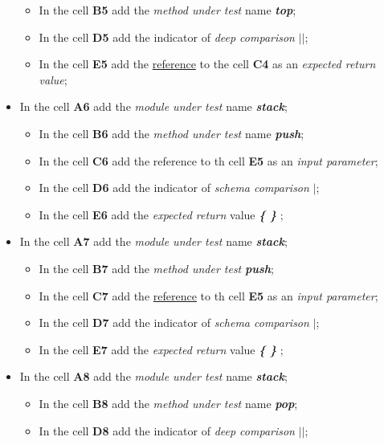 \begin{itemize}
\begin{itemize}
		\item In the cell \textbf{B5} add the \textit{method under test} name \textit{\textbf{top}};
		\item In the cell \textbf{D5} add the indicator of \textit{deep comparison}\textit{ \textbf{$||$}};
		\item In the cell \textbf{E5} add the \underline{reference} to the cell \textbf{C4} as an \textit{expected return value};
	\end{itemize}
%	
	\item In the cell \textbf{A6} add the \textit{module under test} name\textit{ \textbf{stack}};
	\begin{itemize}
		\item In the cell \textbf{B6} add the \textit{method under test} name\textit{ \textbf{push}};
		\item In the cell \textbf{C6} add the reference to th cell \textbf{E5} as an \textit{ input parameter};
		\item In the cell \textbf{D6} add the indicator of \textit{schema comparison}\textit{\textbf{ $|$}};
		\item In the cell \textbf{E6} add the \textit{expected return} value\textit{ \textbf{ \{ \} }};
	\end{itemize}
%	
	\item In the cell \textbf{A7} add the \textit{module under test} name\textit{\textbf{ stack}};
	\begin{itemize}
		\item In the cell \textbf{B7} add the \textit{method under test} \textit{\textbf{push}};
		\item In the cell \textbf{C7} add the \underline{reference} to th cell \textbf{E5} as an\textit{ input parameter};
		\item In the cell \textbf{D7} add the indicator of \textit{schema comparison} \textit{\textbf{$|$}};
		\item In the cell \textbf{E7} add the \textit{expected return} value\textit{ \textbf{ \{ \} }};
	\end{itemize}
%	
	\item In the cell \textbf{A8} add the \textit{module under test} name\textit{ \textbf{stack}};
	\begin{itemize}
		\item In the cell \textbf{B8} add the \textit{method under test} name \textit{\textbf{pop}};
		\item In the cell \textbf{D8} add the indicator of \textit{deep comparison} \textit{\textbf{$||$}};

\end{itemize}
\end{itemize}
